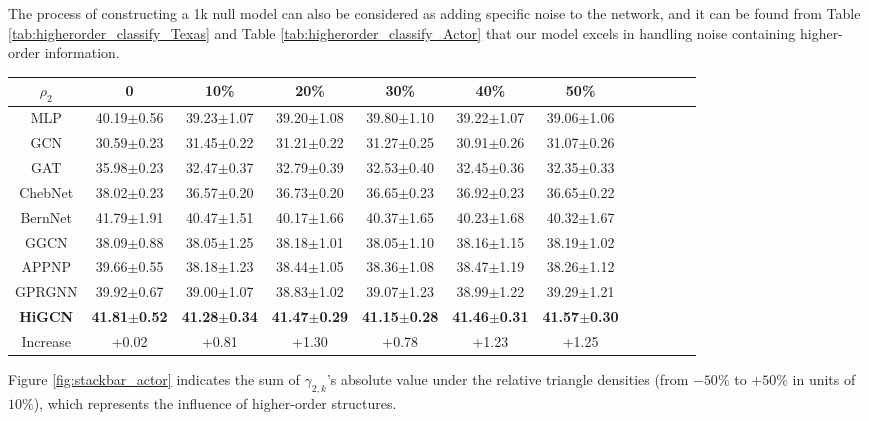 \documentclass[letterpaper]{article} \usepackage{aaai24}
\newcommand \spm[1] {\footnotesize{$\pm$#1} }
\theoremstyle{plain}
\theoremstyle{definition}
\theoremstyle{remark}
\begin{document}
The process of constructing a 1k null model can also be considered as adding specific noise to the network, and it can be found from Table \ref{tab:higherorder_classify_Texas} and Table \ref{tab:higherorder_classify_Actor} that our model excels in handling noise containing higher-order information.


\begin{table*}[!ht] 
\centering
\begin{tabular}{cccccccccccc}\toprule
$\rho_2$    &0   &10\%   &20\%   &30\%  &40\%  &50\%\\
\midrule
MLP
&40.19\spm{0.56}  &39.23\spm{1.07}  &39.20\spm{1.08}  &39.80\spm{1.10}  &39.22\spm{1.07}  &39.06\spm{1.06}\\
GCN      
&30.59\spm{0.23}  &31.45\spm{0.22}  &31.21\spm{0.22}  &31.27\spm{0.25}  &30.91\spm{0.26}  &31.07\spm{0.26}\\
GAT      
&35.98\spm{0.23}  &32.47\spm{0.37}  &32.79\spm{0.39}  &32.53\spm{0.40}  &32.45\spm{0.36}  &32.35\spm{0.33}\\
ChebNet  
&38.02\spm{0.23}  &36.57\spm{0.20}  &36.73\spm{0.20}  &36.65\spm{0.23}  &36.92\spm{0.23}  &36.65\spm{0.22}\\
BernNet  
&41.79\spm{1.91}  &40.47\spm{1.51}  &40.17\spm{1.66}  &40.37\spm{1.65}  &40.23\spm{1.68}  &40.32\spm{1.67}\\
GGCN  
&38.09\spm{0.88}  &38.05\spm{1.25}  &38.18\spm{1.01}  &38.05\spm{1.10}  &38.16\spm{1.15}  &38.19\spm{1.02}\\
APPNP  
&39.66\spm{0.55}  &38.18\spm{1.23}  &38.44\spm{1.05}  &38.36\spm{1.08}  &38.47\spm{1.19}  &38.26\spm{1.12}\\
GPRGNN 
&39.92\spm{0.67}  &39.00\spm{1.07}  &38.83\spm{1.02}  &39.07\spm{1.23}  &38.99\spm{1.22}  &39.29\spm{1.21}\\
\midrule
\textbf{HiGCN}
&\textbf{41.81\spm{0.52}}  &\textbf{41.28\spm{0.34}}  &\textbf{41.47\spm{0.29}}  &\textbf{41.15\spm{0.28}}  &\textbf{41.46\spm{0.31}} &\textbf{41.57\spm{0.30}}\\
\midrule
Increase
&+0.02  &+0.81  &+1.30  &+0.78  &+1.23 &+1.25\\
\bottomrule
\end{tabular}
\caption{Node classification results on Actor with changeable higher-order densities: mean accuracy $(\%)\pm 95\%$ confidence interval. Bold values indicate the best result.}
\label{tab:higherorder_classify_Actor}
\end{table*}


Figure \ref{fig:stackbar_actor} indicates the sum of $\gamma_{2, k}$'s absolute value under the relative triangle densities (from $- 50 \%$ to $+ 50 \%$ in units of $10 \%$), which represents the influence of higher-order structures.
\end{document}
